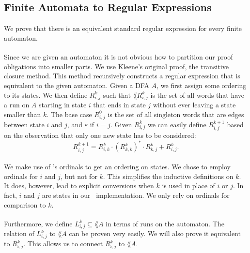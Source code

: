 \subsection{Finite Automata to Regular Expressions}
\paragraph{}
We prove that there is an equivalent standard regular expression for every finite automaton.


\paragraph{}
Since we are given an automaton it is not obvious how to partition our proof obligations into smaller parts.
We use Kleene's original proof, the transitive closure method. 
This method recursively constructs a regular expression that is equivalent to the given automaton.
Given a DFA $A$, we first assign some ordering to its states. We then define $R^k_{i,j}$ such that 
$\lang{R^k_{i,j}}$ is the set of all words that have a run on $A$ starting in state $i$ that ends in state $j$ without ever leaving a state smaller than $k$. 
The base case $R^{0}_{i,j}$ is the set of all singleton words that are edges between state $i$ and $j$, and $\varepsilon$ if $i=j$. 
Given $R^k_{i,j}$ we can easily define $R^{k+1}_{i,j}$ based on the observation that only one new state has to be considered:
\begin{equation*}                    
    R^{k+1}_{i,j} = R^{k}_{i,k} \cdot (R^{k}_{k,k})^* \cdot R^{k}_{k,j} + R^{k}_{i,j}.                    
\end{equation*}
\paragraph{}
We make use of \ssreflect's ordinals to get an ordering on states. 
We chose to employ ordinals for $i$ and $j$, but not for $k$. 
This simplifies the inductive definitions on $k$. 
It does, however, lead to explicit conversions when $k$ is used in place of $i$ or $j$.
In fact, $i$ and $j$ are states in our \coq\ implementation. 
We only rely on ordinals for comparison to $k$.
\paragraph{}
Furthermore, we define $L^k_{i,j} \subseteq \lang{A}$ in terms of runs on the automaton. 
The relation of $L^k_{i,j}$ to $\lang{A}$ can be proven very easily.
We will also prove it equivalent to $R^k_{i,j}$.
This allows us to connect $R^k_{i,j}$ to $\lang{A}$.
\vspace{-0.3cm} 

